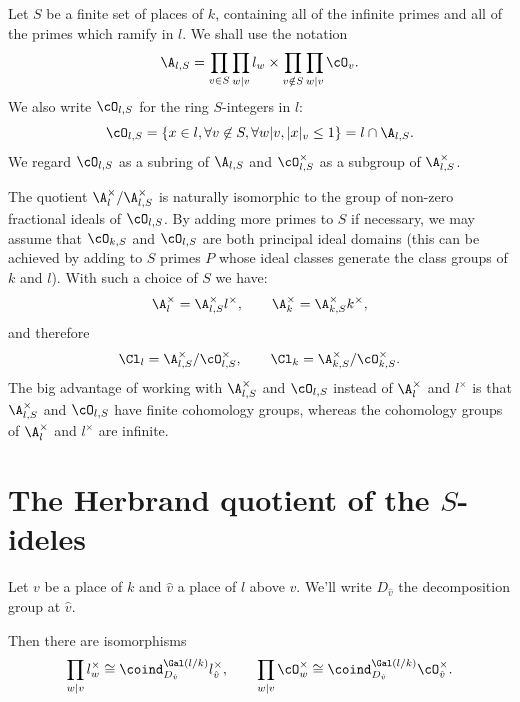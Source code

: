 Let $S$ be a finite set of places of $k$, containing all of the infinite primes and all
of the primes which ramify in $l$.
We shall use the notation
\[
	\A_{l,S} = \prod_{v \in S} \prod_{w | v} l_w \times \prod_{v \notin S} \prod_{w | v} \cO_v.
\]
We also write $\cO_{l,S}$ for the ring $S$-integers in $l$:
\[
	\cO_{l,S} = \{x \in l, \forall v \not\in S, \forall w | v, |x|_v \le 1\} = l \cap \A_{l,S}.
\]
We regard $\cO_{l,S}$ as a subring of $\A_{l,S}$ and
$\cO_{l,S}^\times$ as a subgroup of $\A_{l,S}^\times$.

The quotient $\A_l^\times / \A_{l,S}^\times$ is naturally isomorphic to the
group of non-zero fractional ideals of $\cO_{l,S}$.
By adding more primes to $S$ if necessary, we may assume that $\cO_{k,S}$ and $\cO_{l,S}$ are both
principal ideal domains (this can be achieved by adding to $S$ primes $P$ whose ideal classes
generate the class groups of $k$ and $l$).
With such a choice of $S$ we have:
\[
	\A_{l}^\times = \A_{l,S}^\times l^\times,
	\qquad
	\A_k^\times = \A_{k,S}^\times k^\times,
\]
and therefore
\[
	\Cl_{l} = \A_{l,S}^\times / \cO_{l,S}^\times, \qquad
	\Cl_{k} = \A_{k,S}^\times / \cO_{k,S}^\times.
\]
The big advantage of working with $\A_{l,S}^\times$ and $\cO_{l,S}$ instead of $\A_l^\times$ and
$l^\times$ is that $\A_{l,S}^\times$ and $\cO_{l,S}$ have finite cohomology groups,
whereas the cohomology groups of $\A_l^\times$ and $l^\times$ are infinite.





\section{The Herbrand quotient of the \texorpdfstring{$S$}{S}-ideles}

Let $v$ be a place of $k$ and $\hat v$ a place of $l$ above $v$.
We'll write $D_{\hat v}$ the decomposition group at $\hat v$.

\begin{lemma} \label{lem:semi-local iso coind}
	Then there are isomorphisms
	\[
		\prod_{w | v} l_w^\times
		\cong
		\coind_{D_{\hat v}}^{\Gal(l/k)} l_{\hat v}^\times,
		\qquad
		\prod_{w | v} \cO_w^\times
		\cong
		\coind_{D_{\hat v}}^{\Gal(l/k)} \cO_{\hat v}^\times.
	\]
\end{lemma}

